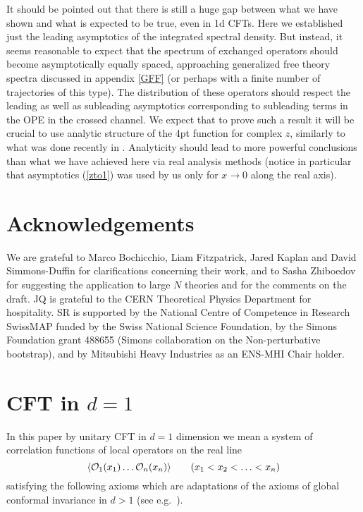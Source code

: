 \documentclass[12pt]{article}
\newcommand{\reef}[1]{(\ref{#1})}
\newcommand{\beq}{\begin{equation}}
\newcommand{\eeq}{\end{equation}}
\def\calO {{\cal O}}
\numberwithin{equation}{section}
\begin{document}
It should be pointed out that there is still a huge gap between what we have shown and what is expected to be true, even in 1d CFTs. Here we established just the leading asymptotics of the integrated spectral density. But instead, it seems reasonable to expect that the spectrum of exchanged operators should become asymptotically equally spaced, approaching generalized free theory spectra discussed in appendix \ref{GFF} (or perhaps with a finite number of trajectories of this type). The distribution of these operators should respect the leading as well as subleading asymptotics corresponding to subleading terms in the OPE in the crossed channel. We expect that to prove such a result it will be crucial to use analytic structure of the 4pt function for complex $z$, similarly to what was done recently in \cite{Caron-Huot:2017vep}. Analyticity should lead to more powerful conclusions than what we have achieved here via real analysis methods (notice in particular that asymptotics \reef{zto1} was used by us only for $x\to0$ along the real axis). 



\section*{Acknowledgements}

We are grateful to Marco Bochicchio, Liam Fitzpatrick, Jared Kaplan and David Simmons-Duffin for clarifications concerning their work, and to Sasha Zhiboedov for suggesting the application to large $N$ theories and for the comments on the draft. JQ is grateful to the CERN Theoretical Physics Department for hospitality. SR is supported by the National Centre of Competence in Research SwissMAP funded by the Swiss National Science Foundation, by the Simons Foundation grant 488655 (Simons collaboration on the Non-perturbative bootstrap), and by Mitsubishi Heavy Industries as an ENS-MHI Chair holder.

\appendix
\section{CFT in $d=1$}
\label{CFT1}

In this paper by unitary CFT in $d=1$ dimension we mean a system of correlation functions of local operators on the real line 
\beq
\langle \calO_1(x_1)\ldots \calO_n(x_n) \rangle\qquad (x_1<x_2<\ldots<x_n) 
\eeq
satisfying the following axioms which are adaptations of the axioms of global conformal invariance in $d>1$ (see e.g.~\cite{Rychkov:2016iqz}).
\end{document}
